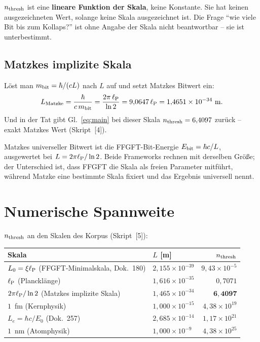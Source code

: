 \begin{tcolorbox}[warnbox, title={Was daraus folgt}]
  $n_{\mathrm{thresh}}$ ist eine \textbf{lineare Funktion der Skala}, keine Konstante.
  Sie hat keinen ausgezeichneten Wert, solange keine Skala ausgezeichnet
  ist. Die Frage \enquote{wie viele Bit bis zum Kollaps?} ist ohne
  Angabe der Skala nicht beantwortbar -- sie ist unterbestimmt.
\end{tcolorbox}

\subsection{Matzkes implizite Skala}

Löst man $m_{\mathrm{bit}} = \hbar/(cL)$ nach $L$ auf und setzt Matzkes Bitwert ein:
\begin{equation}
  L_{\mathrm{Matzke}} = \frac{\hbar}{c\,m_{\mathrm{bit}}}
                      = \frac{2\pi\,\ell_{\mathrm{P}}}{\ln 2}
                      = 9{,}0647\,\ell_{\mathrm{P}}
                      = 1{,}4651\times10^{-34}~\mathrm{m}.
\end{equation}
Und in der Tat gibt Gl.~\eqref{eq:main} bei dieser Skala
$n_{\mathrm{thresh}} = 6{,}4097$ zurück -- exakt Matzkes Wert (Skript~[4]). \B

\begin{tcolorbox}[ffgftbox, title={Kernbefund}]
  Matzkes universeller Bitwert ist die FFGFT-Bit-Energie
  $E_{\mathrm{bit}} = \hbar c/L$, ausgewertet bei $L = 2\pi\ell_{\mathrm{P}}/\ln 2$.
  Beide Frameworks rechnen mit derselben Größe; der Unterschied ist,
  dass FFGFT die Skala als freien Parameter mitführt, während Matzke
  eine bestimmte Skala fixiert und das Ergebnis universell nennt.
\end{tcolorbox}

\section{Numerische Spannweite}

$n_{\mathrm{thresh}}$ an den Skalen des Korpus (Skript~[5]):

\begin{center}
\small
\begin{tabular}{@{}llr@{}}
  \toprule
  \textbf{Skala} & $L$ [m] & $n_{\mathrm{thresh}}$ \\
  \midrule
  $L_0 = \xi\ell_{\mathrm{P}}$ (FFGFT-Minimalskala, Dok.~180) & $2{,}155\times10^{-39}$ & $9{,}43\times10^{-5}$ \\
  $\ell_{\mathrm{P}}$ (Plancklänge)                            & $1{,}616\times10^{-35}$ & $0{,}7071$ \\
  $2\pi\ell_{\mathrm{P}}/\ln 2$ (Matzkes implizite Skala)      & $1{,}465\times10^{-34}$ & $\mathbf{6{,}4097}$ \\
  $1$~fm (Kernphysik)                            & $1{,}000\times10^{-15}$ & $4{,}38\times10^{19}$ \\
  $L_e = \hbar c/E_0$ (Dok.~257)                 & $2{,}685\times10^{-14}$ & $1{,}17\times10^{21}$ \\
  $1$~nm (Atomphysik)                            & $1{,}000\times10^{-9}$  & $4{,}38\times10^{25}$ \\
  \bottomrule
\end{tabular}
\end{center}


